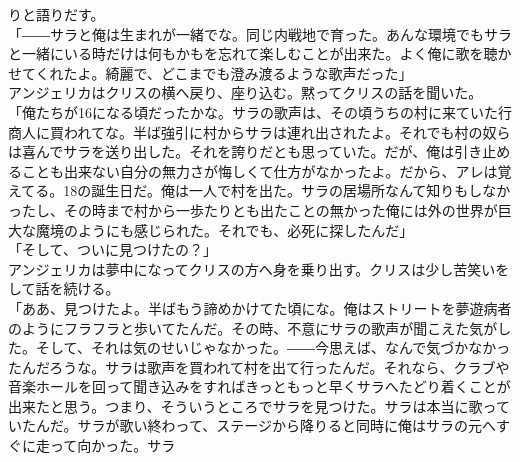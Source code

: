 \documentclass[b5j,10pt,openany]{jsbook}
\begin{document}
りと語りだす。\\「――サラと俺は生まれが一緒でな。同じ内戦地で育った。あんな環境でもサラと一緒にいる時だけは何もかもを忘れて楽しむことが出来た。よく俺に歌を聴かせてくれたよ。綺麗で、どこまでも澄み渡るような歌声だった」\\アンジェリカはクリスの横へ戻り、座り込む。黙ってクリスの話を聞いた。\\「俺たちが16になる頃だったかな。サラの歌声は、その頃うちの村に来ていた行商人に買われてな。半ば強引に村からサラは連れ出されたよ。それでも村の奴らは喜んでサラを送り出した。それを誇りだとも思っていた。だが、俺は引き止めることも出来ない自分の無力さが悔しくて仕方がなかったよ。だから、アレは覚えてる。18の誕生日だ。俺は一人で村を出た。サラの居場所なんて知りもしなかったし、その時まで村から一歩たりとも出たことの無かった俺には外の世界が巨大な魔境のようにも感じられた。それでも、必死に探したんだ」\\「そして、ついに見つけたの？」\\アンジェリカは夢中になってクリスの方へ身を乗り出す。クリスは少し苦笑いをして話を続ける。\\「ああ、見つけたよ。半ばもう諦めかけてた頃にな。俺はストリートを夢遊病者のようにフラフラと歩いてたんだ。その時、不意にサラの歌声が聞こえた気がした。そして、それは気のせいじゃなかった。――今思えば、なんで気づかなかったんだろうな。サラは歌声を買われて村を出て行ったんだ。それなら、クラブや音楽ホールを回って聞き込みをすればきっともっと早くサラへたどり着くことが出来たと思う。つまり、そういうところでサラを見つけた。サラは本当に歌っていたんだ。サラが歌い終わって、ステージから降りると同時に俺はサラの元へすぐに走って向かった。サラ
\end{document}
